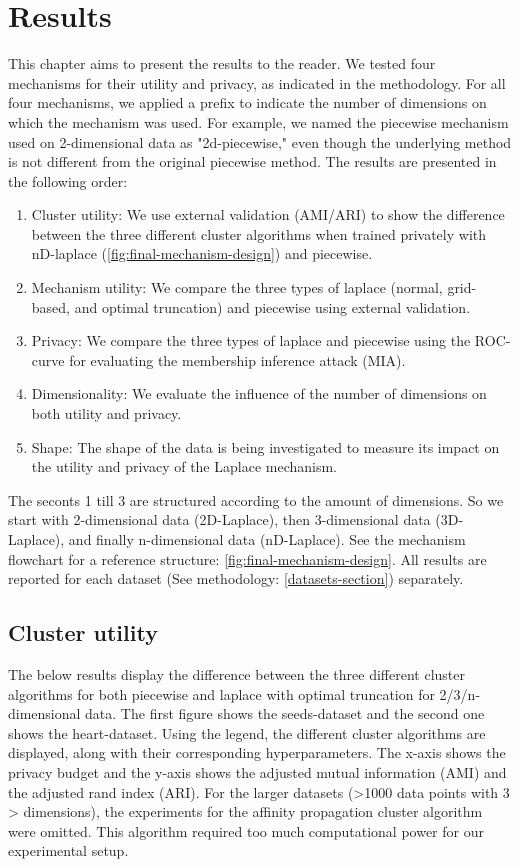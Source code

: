 \chapter{Results}
This chapter aims to present the results to the reader.
We tested four mechanisms for their utility and privacy, as indicated in the methodology.
For all four mechanisms, we applied a prefix to indicate the number of dimensions on which the mechanism was used.
For example, we named the piecewise mechanism used on 2-dimensional data as "2d-piecewise," even though the underlying method is not different from the original piecewise method.
The results are presented in the following order:
\begin{enumerate}
    \item Cluster utility: We use external validation (AMI/ARI) to show the difference between the three different cluster algorithms when trained privately with nD-laplace (\ref{fig:final-mechanism-design}) and piecewise.
    \item Mechanism utility: We compare the three types of laplace (normal, grid-based, and optimal truncation) and piecewise using external validation.
    \item Privacy: We compare the three types of laplace and piecewise using the ROC-curve for evaluating the membership inference attack (MIA).
    \item Dimensionality: We evaluate the influence of the number of dimensions on both utility and privacy. 
    \item Shape: The shape of the data is being investigated to measure its impact on the utility and privacy of the Laplace mechanism. 
\end{enumerate}
The seconts 1 till 3 are structured according to the amount of dimensions. So we start with 2-dimensional data (2D-Laplace), then 3-dimensional data (3D-Laplace), and finally n-dimensional data (nD-Laplace). See the mechanism flowchart for a reference structure: \ref{fig:final-mechanism-design}.
All results are reported for each dataset (See methodology: \ref{datasets-section}) separately.
\newpage
\section{Cluster utility}
The below results display the difference between the three different cluster algorithms for both piecewise and laplace with optimal truncation for 2/3/n-dimensional data.
The first figure shows the seeds-dataset and the second one shows the heart-dataset. \newline
Using the legend, the different cluster algorithms are displayed, along with their corresponding hyperparameters. The x-axis shows the privacy budget and the y-axis shows the adjusted mutual information (AMI) and the adjusted rand index (ARI).
For the larger datasets (>1000 data points with 3 > dimensions), the experiments for the affinity propagation cluster algorithm were omitted. This algorithm required too much computational power for our experimental setup.
